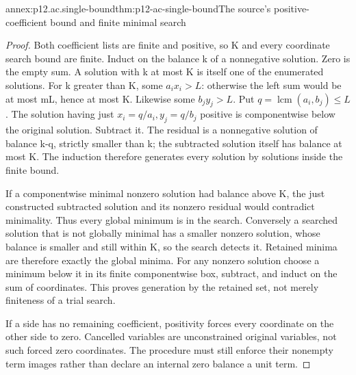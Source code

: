 \begin{annexitem}{annex:p12.ac.single-bound}{thm:p12-ac-single-bound}{The source's positive-coefficient bound and finite minimal search}
\begin{proof}
Both coefficient lists are finite and positive, so K and every
coordinate search bound are finite. Induct on the balance k of a
nonnegative solution. Zero is the empty sum. A solution with k at
most K is itself one of the enumerated solutions. For k greater
than K, some \(a_ix_i>L\): otherwise the left sum would be at
most mL, hence at most K. Likewise some \(b_jy_j>L\).
Put \(q=\operatorname{lcm}(a_i,b_j)\leq L\). The solution
having just \(x_i=q/a_i,y_j=q/b_j\) positive is componentwise
below the original solution. Subtract it. The residual is a
nonnegative solution of balance k-q, strictly smaller than k;
the subtracted solution itself has balance at most K. The induction
therefore generates every solution by solutions inside the finite bound.

If a componentwise minimal nonzero solution had balance above K,
the just constructed subtracted solution and its nonzero residual
would contradict minimality. Thus every global minimum is in the
search. Conversely a searched solution that is not globally minimal
has a smaller nonzero solution, whose balance is smaller and still
within K, so the search detects it. Retained minima are therefore
exactly the global minima. For any nonzero solution choose a minimum
below it in its finite componentwise box, subtract, and induct on
the sum of coordinates. This proves generation by the retained set,
not merely finiteness of a trial search.

If a side has no remaining coefficient, positivity forces every
coordinate on the other side to zero. Cancelled variables are
unconstrained original variables, not such forced zero coordinates.
The procedure must still enforce their nonempty term images rather
than declare an internal zero balance a unit term.
\end{proof}
\end{annexitem}

